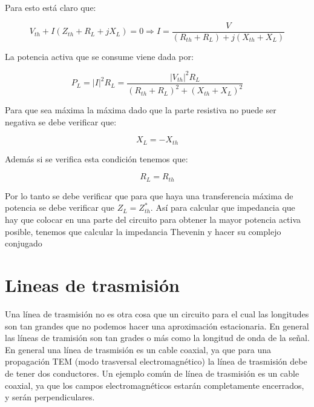 \documentclass[12pt,a4paper]{article}
\begin{document}
Para esto está claro que:

\begin{equation}
V_{th} + I(Z_{th}+R_L + j X_L) = 0 \Longrightarrow I = \dfrac{V}{(R_{th}+R_L)+j(X_{th}+X_L)}
\end{equation}

La potencia activa que se consume viene dada por:

\begin{equation}
P_L = |I|^2 R_L = \dfrac{|V_{th}|^2 R_L}{(R_{th}+R_L)^2+(X_{th}+X_L)^2}
\end{equation}

Para que sea máxima la máxima dado que la parte resistiva no puede ser negativa se debe verificar que:

\begin{equation}
X_L = -X_{th} 
\end{equation}

Además si se verifica esta condición tenemos que:

\begin{equation}
R_L = R_{th}
\end{equation}

Por lo tanto se debe verificar que para que haya una transferencia máxima de potencia se debe verificar que $Z_L = Z_{th}^*$. Así para calcular que impedancia que hay que colocar en una parte del circuito para obtener la mayor potencia activa posible, tenemos que calcular la impedancia Thevenin y hacer su complejo conjugado

\newpage

\section{Lineas de trasmisión}

Una línea de trasmisión no es otra cosa que un circuito para el cual las longitudes son tan grandes que no podemos hacer una aproximación estacionaria. En general las líneas de tramisión son tan grades o más como la longitud de onda de la señal.  \\

En general una línea de trasmisión es un cable coaxial, ya que para una propagación TEM (modo trasversal electromagnético) la línea de trasmisión debe de tener dos conductores. Un ejemplo común de línea de trasmisión es un cable coaxial, ya que los campos electromagnéticos estarán completamente encerrados, y serán perpendiculares. \\
\end{document}
